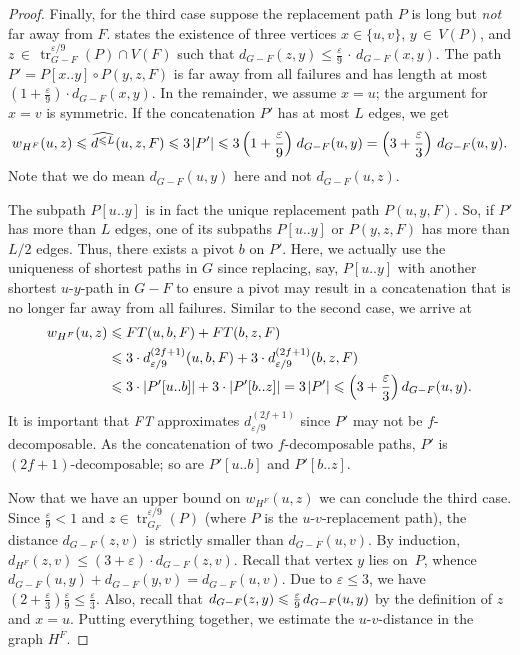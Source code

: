 \documentclass{theoretics}
\DeclareMathOperator{\tr}{tr}
\newcommand*{\length}[1]{|#1|}
\newcommand*{\nwspace}{\hspace*{.1em}}
\renewcommand{\le}{\leqslant}
\newcommand{\eps}{\varepsilon}
\begin{document}
\begin{proof}
  Finally, for the third case suppose the replacement path $P$ is long but \emph{not} far away from $F$.
   states the existence of three vertices $x \in \{u,v\}$, $y \,{\in}\, V(P)$,
  and $z \,{\in}\, \tr^{\eps/9}_{G-F}(P) \cap V(F)$
  such that $d_{G-F}(z,y) \le \tfrac{\eps}{9} \,{\cdot}\, d_{G-F}(x,y)$.
  The path $P' = P[x..y] \circ P(y,z,F)$ is far away from all failures
  and has length at most \mbox{$(1+ \tfrac{\eps}{9}) \cdot d_{G-F}(x,y)$}.
%  
  In the remainder, we assume $x=u$; the argument for $x = v$ is symmetric.
  If the concatenation $P'$ has at most $L$ edges, we get
  \begin{equation*}
    w_{H^F}(u,z) \le \widehat{d^{\le L}}(u,z,F) \le 3 \nwspace \length{P'}
      \le 3 \left(1+\frac{\eps}{9}\right) \nwspace d_{G-F}(u,y) = \left(3+\frac{\eps}{3} \right) \, d_{G-F}(u,y).
  \end{equation*}
  Note that we do mean $d_{G-F}(u,y)$ here and not $d_{G-F}(u,z)$.
  
  The subpath $P[u..y]$ is in fact the unique replacement path $P(u,y,F)$.
  So, if $P'$ has more than $L$ edges,
  one of its subpaths $P[u..y]$ or $P(y,z,F)$ has more than $L/2$ edges.
  Thus, there exists a pivot $b$ on $P'$.
  Here, we actually use the uniqueness of shortest paths in $G$
  since replacing, say, $P[u..y]$  with another shortest $u$-$y$-path in $G-F$
  to ensure a pivot
  may result in a concatenation that is no longer far away from all failures.
%  
  Similar to the second case, we arrive at
  \begin{align*}
    w_{H^F}(u,z) &\le FT(u,b,F) + FT(b,z,F)\\
      &\le 3 \cdot d^{(2f+1)}_{\eps/9}(u,b,F)
        +3 \cdot d^{(2f+1)}_{\eps/9}(b,z,F)\\
      &\le 3 \cdot \length{P'[u..b]} + 3 \cdot \length{P'[b..z]}
       = 3 \nwspace \length{P'}
       \le \left(3+\frac{\eps}{3}\right) d_{G-F}(u,y).
  \end{align*}
  It is important that \emph{FT} approximates $d^{(2f+1)}_{\eps/9}$
  since $P'$ may not be \mbox{$f$-decomposable}.
  As the concatenation of two $f$-decomposable paths,
  $P'$ is $(2f{+}1)$-decomposable; so are $P'[u..b]$ and $P'[b..z]$.
  
  Now that we have an upper bound on $w_{H^F}(u,z)$
  we can conclude the third case.
  Since $\tfrac{\eps}{9} < 1$ and $z \in \tr^{\eps/9}_{G_F}(P)$ 
  (where $P$ is the $u$-$v$-replacement path), the distance $d_{G-F}(z,v)$
  is strictly smaller than $d_{G-F}(u,v)$.
  By induction, $d_{H^F}(z,v) \le (3{+}\eps) \cdot d_{G-F}(z,v)$.
  Recall that vertex $y$ lies on~$P$, whence $d_{G-F}(u,y) + d_{G-F}(y,v) = d_{G-F}(u,v)$.
  Due to $\eps \le 3$, we have 
  $(2{+}\tfrac{\eps}{3}) \tfrac{\eps}{9} \le \tfrac{\eps}{3}$.
  Also, recall that $d_{G-F}(z,y) \le \tfrac{\eps}{9} \nwspace d_{G-F}(u,y)$ 
  by the definition of $z$ and $x = u$.
  Putting everything together, we estimate the $u$-$v$-distance in the graph $H^F$.


\end{proof}
\end{document}
